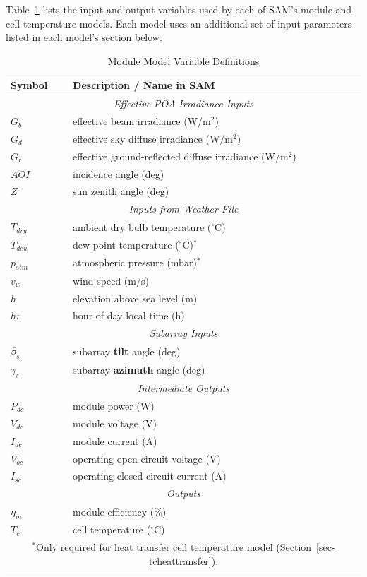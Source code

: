 \documentclass[12pt,letterpaper]{article}
\newcommand\AOI{\ensuremath{\mathit{AOI}}}
\begin{document}
Table~\ref{tab-modulevars} lists the input and output variables used by each of SAM's module and cell temperature models. Each model uses an additional set of input parameters listed in each model's section below.

\begin{table}
\begin{center}
\caption{Module Model Variable Definitions}
\begin{tabular}{ll}
\midrule
Symbol & Description / \textbf{Name in SAM}\\
\midrule
\multicolumn{2}{c}{\textit{Effective POA Irradiance Inputs}}\\
$G_b$ & effective beam irradiance (W/m$^2$)\\
$G_d$ & effective sky diffuse irradiance (W/m$^2$) \\
$G_r$ & effective ground-reflected diffuse irradiance (W/m$^2$)  \\
$\AOI$ & incidence angle (deg)\\
$Z$ & sun zenith angle (deg)\\
\midrule
\multicolumn{2}{c}{\textit{Inputs from Weather File}}\\
$T_{dry}$ & ambient dry bulb temperature ($^\circ$C) \\
$T_{dew}$ & dew-point temperature ($^\circ$C)$^\ast$ \\
$p_{atm}$ & atmospheric pressure (mbar)$^\ast$\\
$v_w$ & wind speed (m/s)\\
$h$ & elevation above sea level (m)\\
$\mathit{hr}$ & hour of day local time (h)\\
\midrule
\multicolumn{2}{c}{\textit{Subarray Inputs}}\\
$\beta_s$ & subarray \textbf{tilt} angle (deg) \\
$\gamma_s$ & subarray \textbf{azimuth} angle (deg)\\
\midrule
\multicolumn{2}{c}{\textit{Intermediate Outputs}}\\
$P_{dc}$ & module power (W)\\
$V_{dc}$ & module voltage (V)\\
$I_{dc}$ & module current  (A)\\
$V_{oc}$ & operating open circuit voltage (V) \\
$I_{sc}$ & operating closed circuit current (A)\\
\midrule
\multicolumn{2}{c}{\textit{Outputs}}\\
$\eta_m$ & module efficiency (\%)\\
$T_c$ & cell temperature ($^\circ$C)\\
\midrule
\multicolumn{2}{c}{$^\ast$Only required for heat transfer cell temperature model (Section~\ref{sec-tcheattransfer}).}\\

\end{tabular}
\label{tab-modulevars}
\end{center}
\end{table}
\end{document}
